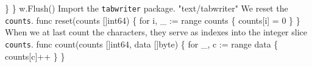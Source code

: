           \}
\}
w.Flush()
\nwendcode{}\nwdocspar
Import the \texttt{tabwriter} package.
\nwenddocs{}\plusendmoddef\nwstartdeflinemarkup{}\nwenddeflinemarkup
"text/tabwriter"
\nwendcode{}\nwdocspar
We reset the \texttt{counts}.
\nwenddocs{}\plusendmoddef\nwstartdeflinemarkup{}\nwenddeflinemarkup
func reset(counts []int64) \{
          for i, \_ := range counts \{
                  counts[i] = 0
          \}
\}
\nwendcode{}\nwdocspar
When we at last count the characters, they serve as indexes into the
integer slice \texttt{counts}.
\nwenddocs{}\plusendmoddef\nwstartdeflinemarkup{}\nwenddeflinemarkup
func count(counts []int64, data []byte) \{
          for \_, c := range data \{
                  counts[c]++
          \}
\}
\nwendcode{}\nwdocspar
